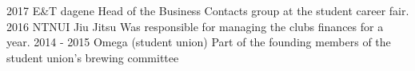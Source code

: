 \vspace{1em} %


\begin{cvSmallExps}
    \cvSmallExp
        {2017} %
        {E\&T dagene} %
        {Head of the Business Contacts group at the student career fair.} %
    \cvSmallExp
        {2016} %
        {NTNUI Jiu Jitsu} %
        {Was responsible for managing the clubs finances for a year.} %
    \cvSmallExp
        {2014 - 2015} %
        {Omega (student union)} %
        {Part of the founding members of the student union's brewing committee} %
\end{cvSmallExps}